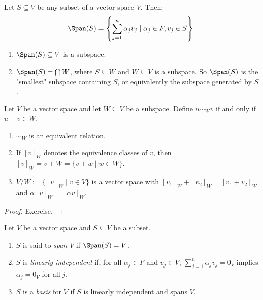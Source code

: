     \begin{definition}
        Let $S \subseteq V$ be any subset of a vector space $V$. Then:
            \begin{equation*}
            \begin{split}
                \Span(S) = \left\{\sum_{j = 1}^n \alpha_j v_j \mid \alpha_j \in F, v_j \in S\right\}.
            \end{split}
            \end{equation*}
    \end{definition}

    \begin{note} \phantom{a}
        \begin{enumerate}[label = (\arabic*)]
            \item $\Span(S) \subseteq V$ is a subspace.
            \item $\Span(S) = \bigcap W$, where $S \subseteq W$ and $W \subseteq V$ is a subspace. So $\Span(S)$ is the "smallest" subspace containing $S$, or equivalently the subspace generated by $S$.
        \end{enumerate}
    \end{note}

    \begin{proposition}
        Let $V$ be a vector space and let $W \subseteq V$ be a subspace. Define $u \sim_W v$ if and only if $u - v \in W$.
            \begin{enumerate}[label = (\arabic*)]
                \item $\sim_W$ is an equivalent relation.
                \item If $[v]_W$ denotes the equivalence classes of $v$, then $[v]_W = v+W = \{v+w \mid w \in W\}$.
                \item $V/W := \{[v]_W \mid v \in V\}$ is a vector space with $[v_1]_W + [v_2]_W = [v_1 + v_2]_W$ and  $\alpha[v]_W = [\alpha v]_W$.
            \end{enumerate}
    \end{proposition}
        \begin{proof}
            Exercise.
        \end{proof}

    \begin{definition}
        Let $V$ be a vector space and $S \subseteq V$ be a subset.
            \begin{enumerate}[label = (\arabic*)]
                \item $S$ is said to \textit{span} $V$ if $\Span(S) = V$.
                \item $S$ is \textit{linearly independent} if, for all $\alpha_j \in F$ and $v_j \in V$, $\sum_{j = 1}^n \alpha_j v_j = 0_V$ implies $\alpha_j = 0_V$ for all $j$.
                \item $S$ is a \textit{basis} for $V$ if $S$ is linearly independent and spans $V$.
            \end{enumerate}
    \end{definition}

